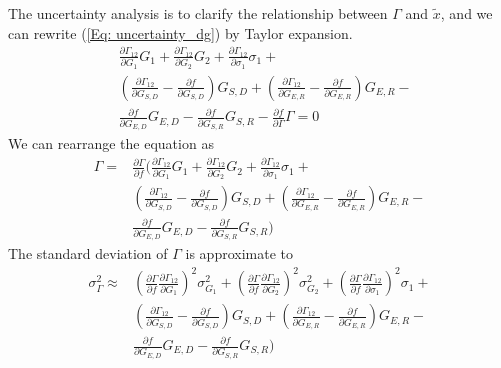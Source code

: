 The uncertainty analysis is to clarify  the relationship between $\Gamma$ and $\tilde{x}$, and we can rewrite (\ref{Eq: uncertainty_dg}) by Taylor expansion.
\begin{align}
& \frac{\partial \Gamma_{12}}{\partial G_1} G_1 + 
\frac{\partial \Gamma_{12}}{\partial G_2} G_2 +
\frac{\partial \Gamma_{12}}{\partial \sigma_1} \sigma_1 + \nonumber \\
&(\frac{\partial \Gamma_{12}}{\partial G_{S,D}} - \frac{\partial f}{\partial G_{S,D}} ) G_{S,D} + 
(\frac{\partial \Gamma_{12}}{\partial G_{E,R}} - \frac{\partial f}{\partial G_{E,R}} ) G_{E,R} - \nonumber \\
&\frac{\partial f}{\partial G_{E,D}} G_{E,D} - 
\frac{\partial f}{\partial G_{S,R}} G_{S,R} -
\frac{\partial f}{\partial \Gamma} \Gamma = 0
\end{align}
We can rearrange the equation as
\begin{align}
\Gamma= 
&\frac{\partial \Gamma}{\partial f}(\frac{\partial \Gamma_{12}}{\partial G_1} G_1 + 
\frac{\partial \Gamma_{12}}{\partial G_2} G_2 +
\frac{\partial \Gamma_{12}}{\partial \sigma_1} \sigma_1 + \nonumber \\
&(\frac{\partial \Gamma_{12}}{\partial G_{S,D}} - \frac{\partial f}{\partial G_{S,D}} ) G_{S,D} + 
(\frac{\partial \Gamma_{12}}{\partial G_{E,R}} - \frac{\partial f}{\partial G_{E,R}} ) G_{E,R} - \nonumber \\
&\frac{\partial f}{\partial G_{E,D}} G_{E,D} -
\frac{\partial f}{\partial G_{S,R}} G_{S,R})
\end{align}
The standard deviation of $\Gamma$ is approximate to
\begin{align}
\sigma^2_\Gamma \approx 
&(\frac{\partial \Gamma}{\partial f} \frac{\partial \Gamma_{12}}{\partial G_1})^2 \sigma^2_{G_1} + 
(\frac{\partial \Gamma}{\partial f} \frac{\partial \Gamma_{12}}{\partial G_2})^2 \sigma^2_{G_2} +
(\frac{\partial \Gamma}{\partial f} \frac{\partial \Gamma_{12}}{\partial \sigma_1})^2 \sigma_1 + \nonumber \\
&(\frac{\partial \Gamma_{12}}{\partial G_{S,D}} - \frac{\partial f}{\partial G_{S,D}} ) G_{S,D} + 
(\frac{\partial \Gamma_{12}}{\partial G_{E,R}} - \frac{\partial f}{\partial G_{E,R}} ) G_{E,R} - \nonumber \\
&\frac{\partial f}{\partial G_{E,D}} G_{E,D} -
\frac{\partial f}{\partial G_{S,R}} G_{S,R})
\end{align}
